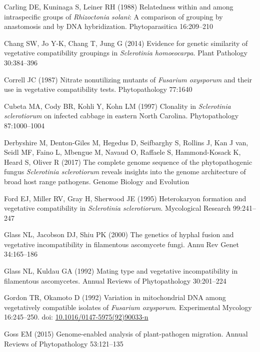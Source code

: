 \hypertarget{ref-Carling1988-xk}{}
Carling DE, Kuninaga S, Leiner RH (1988) Relatedness within and among
intraspecific groups of \emph{Rhizoctonia solani}: A comparison of
grouping by anastomosis and by DNA hybridization. Phytoparasitica
16:209--210

\hypertarget{ref-Chang2014-rn}{}
Chang SW, Jo Y-K, Chang T, Jung G (2014) Evidence for genetic similarity
of vegetative compatibility groupings in \emph{Sclerotinia homoeocarpa}. Plant
Pathology 30:384--396

\hypertarget{ref-Correll1987-hh}{}
Correll JC (1987) Nitrate nonutilizing mutants of \emph{Fusarium
oxysporum} and their use in vegetative compatibility tests.
Phytopathology 77:1640

\hypertarget{ref-Cubeta1997-rr}{}
Cubeta MA, Cody BR, Kohli Y, Kohn LM (1997) Clonality in
\emph{Sclerotinia sclerotiorum} on infected cabbage in eastern North
Carolina. Phytopathology 87:1000--1004

\hypertarget{ref-Derbyshire2017-mx}{}
Derbyshire M, Denton-Giles M, Hegedus D, Seifbarghy S, Rollins J, Kan J
van, Seidl MF, Faino L, Mbengue M, Navaud O, Raffaele S, Hammond-Kosack
K, Heard S, Oliver R (2017) The complete genome sequence of the
phytopathogenic fungus \emph{Sclerotinia sclerotiorum} reveals insights
into the genome architecture of broad host range pathogens. Genome
Biology and Evolution

\hypertarget{ref-Ford1995-wk}{}
Ford EJ, Miller RV, Gray H, Sherwood JE (1995) Heterokaryon formation
and vegetative compatibility in \emph{Sclerotinia sclerotiorum}.
Mycological Research 99:241--247

\hypertarget{ref-Glass2000-cg}{}
Glass NL, Jacobson DJ, Shiu PK (2000) The genetics of hyphal fusion and
vegetative incompatibility in filamentous ascomycete fungi. Annu Rev
Genet 34:165--186

\hypertarget{ref-Glass1992-af}{}
Glass NL, Kuldau GA (1992) Mating type and vegetative incompatibility in
filamentous ascomycetes. Annual Reviews of Phytopathology 30:201--224

\hypertarget{ref-Gordon1992-fs}{}
Gordon TR, Okamoto D (1992) Variation in mitochondrial DNA among
vegetatively compatible isolates of \emph{Fusarium oxysporum}.
Experimental Mycology 16:245--250. doi:
\href{https://doi.org/10.1016/0147-5975(92)90033-n}{10.1016/0147-5975(92)90033-n}

\hypertarget{ref-Goss2015-ue}{}
Goss EM (2015) Genome-enabled analysis of plant-pathogen migration.
Annual Reviews of Phytopathology 53:121--135

